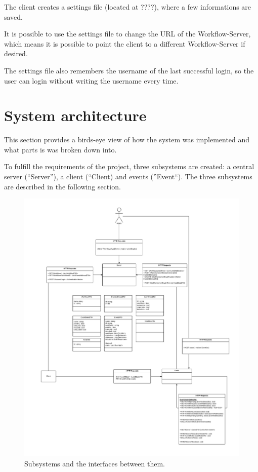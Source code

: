 The client creates a settings file (located at ????), where a few
informations are saved.

It is possible to use the settings file to change the URL of the
Workflow-Server, which means it is possible to point the client to a
different Workflow-Server if desired.

The settings file also remembers the username of the last successful
login, so the user can login without writing the username every time.

\section{System architecture}\label{system-architecture}

This section provides a birds-eye view of how the system was implemented
and what parts is was broken down into.

To fulfill the requirements of the project, three subsystems are
created: a central server (``Server''), a client (``Client) and events
(''Event``). The three subsystems are described in the following
section.

\begin{figure}[htbp]
\centering
\includegraphics{Subsystems.png}
\caption{Subsystems and the interfaces between them.}
\end{figure}

